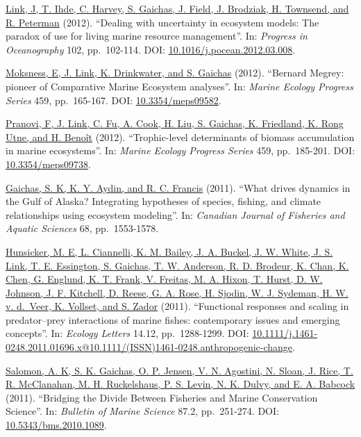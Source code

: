 \documentclass[11pt, a4paper]{awesome-cv}
\begin{document}
\protect\hyperlink{cite-link_dealing_2012}{Link, J, T. Ihde, C. Harvey, S.
Gaichas, J. Field, J. Brodziak, H. Townsend, and R.
Peterman} (2012). ``Dealing with uncertainty in
ecosystem models: The paradox of use for living marine resource
management''. In: \emph{Progress in Oceanography} 102, pp.~102-114. DOI:
\href{https://doi.org/10.1016\%2Fj.pocean.2012.03.008}{10.1016/j.pocean.2012.03.008}.

\protect\hyperlink{cite-moksness_bernard_2012}{Moksness, E, J. Link, K.
Drinkwater, and S. Gaichas} (2012).
``Bernard Megrey: pioneer of Comparative Marine Ecosystem analyses''. In:
\emph{Marine Ecology Progress Series} 459, pp.~165-167. DOI:
\href{https://doi.org/10.3354\%2Fmeps09582}{10.3354/meps09582}.

\protect\hyperlink{cite-pranovi_trophic-level_2012}{Pranovi, F, J. Link, C. Fu,
A. Cook, H. Liu, S. Gaichas, K. Friedland, K. Rong Utne, and H.
Benoît} (2012). ``Trophic-level
determinants of biomass accumulation in marine ecosystems''. In: \emph{Marine
Ecology Progress Series} 459, pp.~185-201. DOI:
\href{https://doi.org/10.3354\%2Fmeps09738}{10.3354/meps09738}.

\protect\hyperlink{cite-gaichas_what_2011}{Gaichas, S. K, K. Y. Aydin, and R.
C. Francis} (2011). ``What drives dynamics in
the Gulf of Alaska? Integrating hypotheses of species, fishing, and
climate relationships using ecosystem modeling''. In: \emph{Canadian Journal
of Fisheries and Aquatic Sciences} 68, pp.~1553-1578.

\protect\hyperlink{cite-hunsicker_functional_2011}{Hunsicker, M. E, L.
Ciannelli, K. M. Bailey, J. A. Buckel, J. W. White, J. S. Link, T. E.
Essington, S. Gaichas, T. W. Anderson, R. D. Brodeur, K. Chan, K. Chen,
G. Englund, K. T. Frank, V. Freitas, M. A. Hixon, T. Hurst, D. W.
Johnson, J. F. Kitchell, D. Reese, G. A. Rose, H. Sjodin, W. J.
Sydeman, H. W. v. d.~Veer, K. Vollset, and S.
Zador} (2011). ``Functional responses
and scaling in predator--prey interactions of marine fishes:
contemporary issues and emerging concepts''. In: \emph{Ecology Letters}
14.12, pp.~1288-1299. DOI:
\href{https://doi.org/10.1111\%2Fj.1461-0248.2011.01696.x\%4010.1111\%2F\%28ISSN\%291461-0248.anthropogenic-change}{10.1111/j.1461-0248.2011.01696.x@10.1111/(ISSN)1461-0248.anthropogenic-change}.

\protect\hyperlink{cite-salomon_bridging_2011}{Salomon, A. K, S. K. Gaichas, O.
P. Jensen, V. N. Agostini, N. Sloan, J. Rice, T. R. McClanahan, M. H.
Ruckelshaus, P. S. Levin, N. K. Dulvy, and E. A.
Babcock} (2011). ``Bridging the Divide
Between Fisheries and Marine Conservation Science''. In: \emph{Bulletin of
Marine Science} 87.2, pp.~251-274. DOI:
\href{https://doi.org/10.5343\%2Fbms.2010.1089}{10.5343/bms.2010.1089}.
\end{document}
